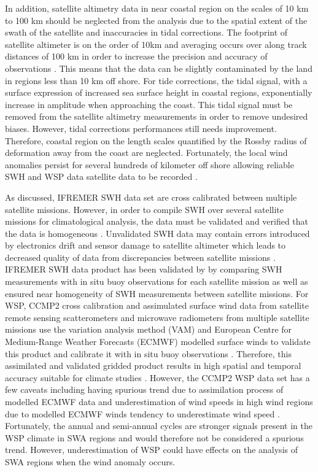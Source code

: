 \documentclass[12pt,twoside]{article}
\begin{document}
In addition, satellite altimetry data in near coastal region on the scales of 10 km to 100 km should be neglected from the analysis due to the spatial extent of the swath of the satellite and inaccuracies in tidal corrections. The footprint of satellite altimeter is on the order of 10km and averaging occurs over along track distances of 100 km in order to increase the precision and accuracy of observations \cite{chelton2001satellite}. This means that the data can be slightly contaminated by the land in regions less than 10 km off shore. For tide corrections, the tidal signal, with a surface expression of increased sea surface height in coastal regions, exponentially increase in amplitude when approaching the coast. This tidal signal must be removed from the satellite altimetry measurements in order to remove undesired biases. However, tidal corrections performances still needs improvement. Therefore, coastal region on the length scales quantified by the Rossby radius of deformation away from the coast are neglected. Fortunately, the local wind anomalies persist for several hundreds of kilometer off shore allowing reliable SWH and WSP data satellite data to be recorded \cite{winant1988marine}. 

As discussed, IFREMER SWH data set are cross calibrated between multiple satellite missions. However, in order to compile SWH over several satellite missions for climatological analysis, the data must be validated and verified that the data is homogeneous \cite{queffeulou2004long}. Unvalidated SWH data may contain errors introduced by electronics drift and sensor damage to satellite altimeter which leads to decreased quality of data from discrepancies between satellite missions \cite{queffeulou2004long}. IFREMER SWH data product has been validated by \citet{queffeulou2004long} by comparing SWH measurements with in situ buoy observations for each satellite mission as well as ensured near homogeneity of SWH measurements between satellite missions. For WSP, CCMP2 cross calibration and assimulated surface wind data from satellite remote sensing scatterometers and microwave radiometers from multiple satellite missions use the variation analysis method (VAM) and European Centre for Medium-Range Weather Forecasts (ECMWF) modelled surface winds to validate this product and calibrate it with in situ buoy observations \cite{atlas2011cross}. Therefore, this assimilated and validated gridded product results in high spatial and temporal accuracy suitable for climate studies \cite{Atlas2011Remote}. However, the CCMP2 WSP data set has a few caveats including having spurious trend due to assimilation process of modelled ECMWF data and underestimation of wind speeds in high wind regions due to modelled ECMWF winds tendency to underestimate wind speed \cite{Atlas2011Remote}. Fortunately, the annual and semi-annual cycles are stronger signals present in the WSP climate in SWA regions and would therefore not be considered a spurious trend. However, underestimation of WSP could have effects on the analysis of SWA regions when the wind anomaly occurs. 
\end{document}
